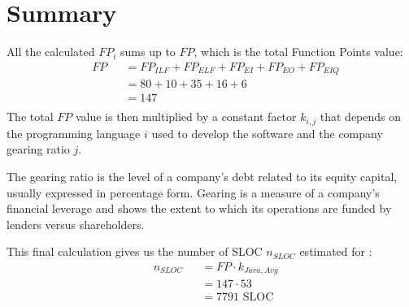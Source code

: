 \section{Summary}
All the calculated $FP_{i}$ sums up to $FP$, which is the total Function Points value:
\begin{equation*}
	\begin{aligned}
		&	FP
		& & = FP_{ILF} + FP_{ELF} + FP_{EI} + FP_{EO} + FP_{EIQ}\\
		&&& = 80 + 10 + 35 + 16 + 6\\
		&&& = 147\\
	\end{aligned}
\end{equation*}
The total $FP$ value is then multiplied by a constant factor $k_{i,j}$ that depends on the programming language $i$ used to develop the software and the company gearing ratio $j$.\par
The gearing ratio is the level of a company's debt related to its equity capital, usually expressed in percentage form.
Gearing is a measure of a company's financial leverage and shows the extent to which its operations are funded by lenders versus shareholders.\par
This final calculation gives us the number of SLOC $n_{SLOC}$ estimated for \PowerEnJoy{}:
\begin{equation*}
	\begin{aligned}
		&   n_{SLOC}
		& & = FP \cdot k_{Java, Avg}\\
		&&& = 147 \cdot 53\\
		&&& = 7791 \text{ SLOC}
	\end{aligned}
\end{equation*}
%
